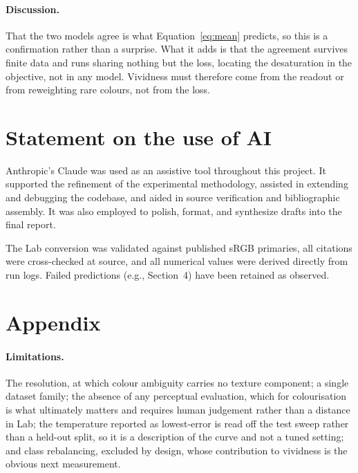 \documentclass{article}
\begin{document}
\paragraph*{Discussion.} That the two models agree is what
Equation~\eqref{eq:mean} predicts, so this is a confirmation rather than a
surprise. What it adds is that the agreement survives finite data and runs
sharing nothing but the loss, locating the desaturation in the objective, not in
any model. Vividness must therefore come from the readout or from reweighting
rare colours, not from the loss.

\section*{Statement on the use of AI}

Anthropic's Claude was used as an assistive tool throughout this
project. It supported the refinement of the experimental methodology,
assisted in extending and debugging the codebase, and aided in source
verification and bibliographic assembly. It was also employed to polish,
format, and synthesize drafts into the final report.

The Lab conversion was validated against published sRGB primaries, all
citations were cross-checked at source, and all numerical values were
derived directly from run logs. Failed predictions (e.g., Section~4)
have been retained as observed.





\section*{Appendix}

\paragraph*{Limitations.} The resolution, at which colour ambiguity carries no
texture component; a single dataset family; the absence of any perceptual
evaluation, which for colourisation is what ultimately matters and requires
human judgement rather than a distance in Lab; the temperature reported as
lowest-error is read off the test sweep rather than a held-out split, so it is
a description of the curve and not a tuned setting; and class rebalancing,
excluded by design, whose contribution to vividness is the obvious next
measurement.
\end{document}
